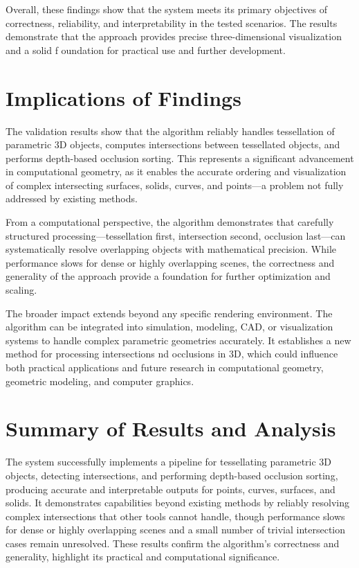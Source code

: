 Overall, these findings show that the system meets its primary 
objectives of correctness, reliability, and interpretability in 
the tested scenarios. The results demonstrate that the approach 
provides precise three-dimensional visualization and a solid f
oundation for practical use and further development.

\section{Implications of Findings}

The validation results show that the algorithm reliably handles 
tessellation of parametric 3D objects, computes intersections 
between tessellated objects, and performs depth-based occlusion 
sorting. This represents a significant advancement in computational 
geometry, as it enables the accurate ordering and visualization of 
complex intersecting surfaces, solids, curves, and points---a problem 
not fully addressed by existing methods.

From a computational perspective, the algorithm demonstrates that 
carefully structured processing—tessellation first, intersection 
second, occlusion last—can systematically resolve overlapping 
objects with mathematical precision. While performance slows for 
dense or highly overlapping scenes, the correctness and generality 
of the approach provide a foundation for further optimization and 
scaling.

The broader impact extends beyond any specific rendering environment. 
The algorithm can be integrated into simulation, modeling, CAD, or 
visualization systems to handle complex parametric geometries 
accurately. It establishes a new method for processing intersections 
nd occlusions in 3D, which could influence both practical 
applications and future research in computational geometry, 
geometric modeling, and computer graphics.

\section{Summary of Results and Analysis}

The system successfully implements a pipeline for tessellating 
parametric 3D objects, detecting intersections, and performing 
depth-based occlusion sorting, producing accurate and interpretable 
outputs for points, curves, surfaces, and solids. It demonstrates 
capabilities beyond existing methods by reliably resolving complex 
intersections that other tools cannot handle, though performance 
slows for dense or highly overlapping scenes and a small number of 
trivial intersection cases remain unresolved. These results confirm 
the algorithm's correctness and generality, highlight its practical 
and computational significance. 
